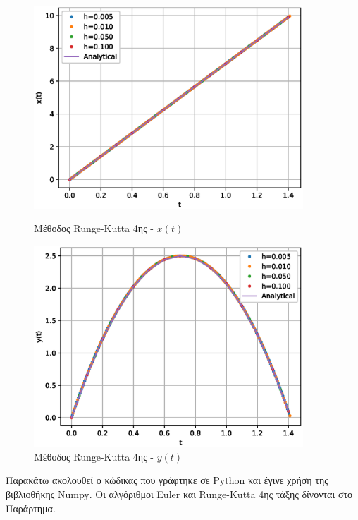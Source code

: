 \documentclass[assignment4.tex]{subfiles}
\begin{document}
\begin{figure}[hp]
	\includegraphics[width=0.9\textwidth]{ex2RungeKutta_x.eps}
	\centering
	\caption{Mέθοδος \textlatin{Runge-Kutta} 4ης - $x(t)$}
	\label{fig:ex2RungeKutta_x}
	\includegraphics[width=0.9\textwidth]{ex2RungeKutta_y.eps}
	\centering
	\caption{Mέθοδος \textlatin{Runge-Kutta} 4ης - $y(t)$}
	\label{fig:ex2RungeKutta_y}
\end{figure}

Παρακάτω ακολουθεί ο κώδικας που γράφτηκε σε \textlatin{Python} και έγινε χρήση της βιβλιοθήκης \textlatin{Numpy}. Οι αλγόριθμοι \textlatin{Euler} και \textlatin{Runge-Kutta} 4ης τάξης δίνονται στο Παράρτημα.

\end{document}

